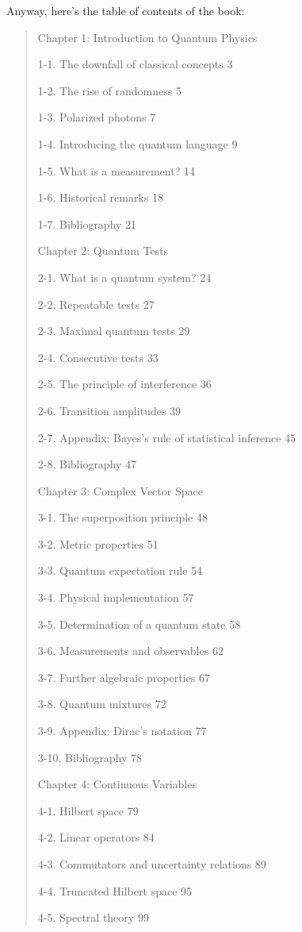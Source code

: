 \documentclass{article}
\begin{document}
Anyway, here's the table of contents of the book:

\begin{quote}
Chapter 1: Introduction to Quantum Physics

1-1. The downfall of classical concepts 3

1-2. The rise of randomness 5

1-3. Polarized photons 7

1-4. Introducing the quantum language 9

1-5. What is a measurement? 14

1-6. Historical remarks 18

1-7. Bibliography 21

Chapter 2: Quantum Tests

2-1. What is a quantum system? 24

2-2. Repeatable tests 27

2-3. Maximal quantum tests 29

2-4. Consecutive tests 33

2-5. The principle of interference 36

2-6. Transition amplitudes 39

2-7. Appendix: Bayes's rule of statistical inference 45

2-8. Bibliography 47

Chapter 3: Complex Vector Space

3-1. The superposition principle 48

3-2. Metric properties 51

3-3. Quantum expectation rule 54

3-4. Physical implementation 57

3-5. Determination of a quantum state 58

3-6. Measurements and observables 62

3-7. Further algebraic properties 67

3-8. Quantum mixtures 72

3-9. Appendix: Dirac's notation 77

3-10. Bibliography 78

Chapter 4: Continuous Variables

4-1. Hilbert space 79

4-2. Linear operators 84

4-3. Commutators and uncertainty relations 89

4-4. Truncated Hilbert space 95

4-5. Spectral theory 99


\end{quote}
\end{document}
